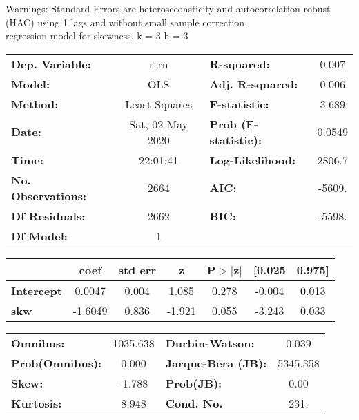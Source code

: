 Warnings: \newline
 [1] Standard Errors are heteroscedasticity and autocorrelation robust (HAC) using 1 lags and without small sample correction\\ 

regression model for skewness, k = 3 h = 3\begin{center}
\begin{tabular}{lclc}
\toprule
\textbf{Dep. Variable:}    &       rtrn       & \textbf{  R-squared:         } &     0.007   \\
\textbf{Model:}            &       OLS        & \textbf{  Adj. R-squared:    } &     0.006   \\
\textbf{Method:}           &  Least Squares   & \textbf{  F-statistic:       } &     3.689   \\
\textbf{Date:}             & Sat, 02 May 2020 & \textbf{  Prob (F-statistic):} &   0.0549    \\
\textbf{Time:}             &     22:01:41     & \textbf{  Log-Likelihood:    } &    2806.7   \\
\textbf{No. Observations:} &        2664      & \textbf{  AIC:               } &    -5609.   \\
\textbf{Df Residuals:}     &        2662      & \textbf{  BIC:               } &    -5598.   \\
\textbf{Df Model:}         &           1      & \textbf{                     } &             \\
\bottomrule
\end{tabular}
\begin{tabular}{lcccccc}
                   & \textbf{coef} & \textbf{std err} & \textbf{z} & \textbf{P$> |$z$|$} & \textbf{[0.025} & \textbf{0.975]}  \\
\midrule
\textbf{Intercept} &       0.0047  &        0.004     &     1.085  &         0.278        &       -0.004    &        0.013     \\
\textbf{skw}       &      -1.6049  &        0.836     &    -1.921  &         0.055        &       -3.243    &        0.033     \\
\bottomrule
\end{tabular}
\begin{tabular}{lclc}
\textbf{Omnibus:}       & 1035.638 & \textbf{  Durbin-Watson:     } &    0.039  \\
\textbf{Prob(Omnibus):} &   0.000  & \textbf{  Jarque-Bera (JB):  } & 5345.358  \\
\textbf{Skew:}          &  -1.788  & \textbf{  Prob(JB):          } &     0.00  \\
\textbf{Kurtosis:}      &   8.948  & \textbf{  Cond. No.          } &     231.  \\
\bottomrule
\end{tabular}
\end{center}

